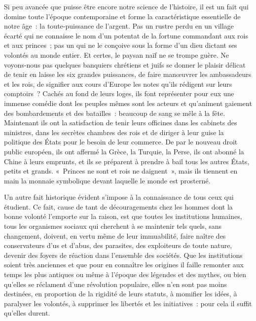 \documentclass[french,twoside]{book} %
\begin{document}
Si peu avancée que puisse être encore notre science de l’histoire, il est un fait qui domine toute l’époque contemporaine et forme la caractéristique essentielle de notre âge : la toute-puissance de l’argent. Pas un rustre perdu en un village écarté qui ne connaisse le nom d’un potentat de la fortune commandant aux rois et aux princes ; pas un qui ne le conçoive sous la forme d’un dieu dictant ses volontés au monde entier. Et certes, le paysan naïf ne se trompe guère. Ne voyons-nous pas quelques banquiers chrétiens et juifs se donner  le plaisir délicat de tenir en laisse les six grandes puissances, de faire manœuvrer les ambassadeurs et les rois, de signifier aux cours d’Europe les notes qu’ils rédigent sur leurs comptoirs ? Cachés au fond de leurs loges, ils font représenter pour eux une immense comédie dont les peuples mêmes sont les acteurs et qu’animent gaiement des bombardements et des batailles : beaucoup de sang se mêle à la fête. Maintenant ils ont la satisfaction de tenir leurs officines dans les cabinets des ministres, dans les secrètes chambres des rois et de diriger à leur guise la politique des États pour le besoin de leur commerce. De par le nouveau droit public européen, ils ont affermé la Grèce, la Turquie, la Perse, ils ont abonné la Chine à leurs emprunts, et ils  se préparent à prendre à bail tous les autres États, petits et grands. « Princes ne sont et rois ne daignent », mais ils tiennent en main la monnaie symbolique devant laquelle le monde est prosterné.\par
Un autre fait historique évident s’impose à la connaissance de tous ceux qui étudient. Ce fait, cause de tant de découragements chez les hommes dont la bonne volonté l’emporte sur la raison, est que toutes les institutions humaines, tous les organismes sociaux qui cherchent à se maintenir tels quels, sans changement, doivent, en vertu même de leur immuabilité, faire naître des conservateurs d’us et d’abus, des parasites, des exploiteurs de toute nature, devenir des foyers de réaction dans l’ensemble des sociétés. Que les institutions  soient très anciennes et que pour en connaître les origines il faille remonter aux temps les plus antiques ou même à l’époque des légendes et des mythes, ou bien qu’elles se réclament d’une révolution populaire, elles n’en sont pas moins destinées, en proportion de la rigidité de leurs statuts, à momifier les idées, à paralyser les volontés, à supprimer les libertés et les initiatives : pour cela il suffit qu’elles durent.\par
\end{document}
